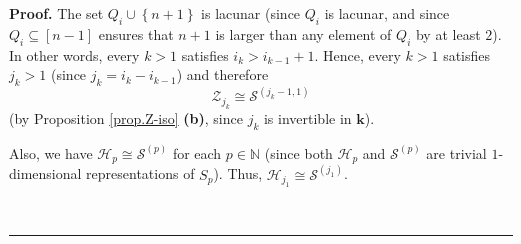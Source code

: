 \documentclass[numbers=enddot,12pt,final,onecolumn,notitlepage]{scrartcl}%
\theoremstyle{definition}
\newenvironment{proof}[1][Proof]{\noindent\textbf{#1.} }{\ \rule{0.5em}{0.5em}}
\begin{document}
\begin{proof}
The set $Q_{i}\cup\left\{  n+1\right\}  $ is lacunar (since $Q_{i}$ is
lacunar, and since $Q_{i}\subseteq\left[  n-1\right]  $ ensures that $n+1$ is
larger than any element of $Q_{i}$ by at least $2$). In other words, every
$k>1$ satisfies $i_{k}>i_{k-1}+1$. Hence, every $k>1$ satisfies $j_{k}>1$
(since $j_{k}=i_{k}-i_{k-1}$) and therefore%
\begin{equation}
\mathcal{Z}_{j_{k}}\cong\mathcal{S}^{\left(  j_{k}-1,1\right)  }
\label{pf.cor.Fi/Fi-1.lr.Z}%
\end{equation}
(by Proposition \ref{prop.Z-iso} \textbf{(b)}, since $j_{k}$ is invertible in
$\mathbf{k}$).

Also, we have $\mathcal{H}_{p}\cong\mathcal{S}^{\left(  p\right)  }$ for each
$p\in\mathbb{N}$ (since both $\mathcal{H}_{p}$ and $\mathcal{S}^{\left(
p\right)  }$ are trivial $1$-dimensional representations of $S_{p}$). Thus,
$\mathcal{H}_{j_{1}}\cong\mathcal{S}^{\left(  j_{1}\right)  }$.


\end{proof}
\end{document}
